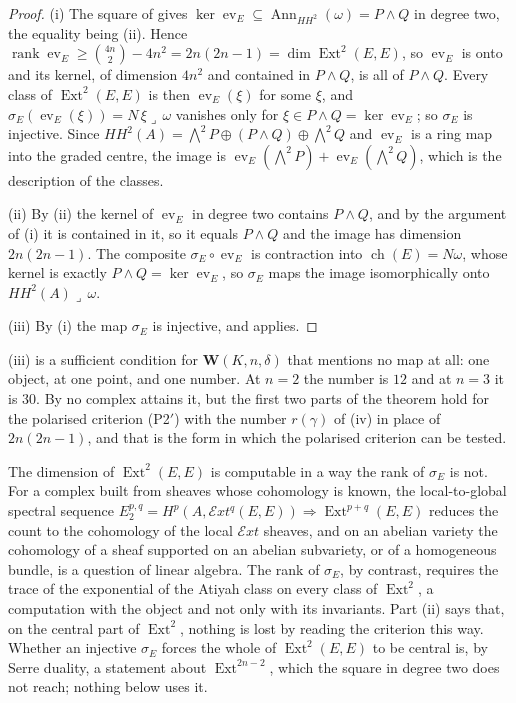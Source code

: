 \documentclass[11pt,reqno]{amsart}
\theoremstyle{plain}
\theoremstyle{definition}
\theoremstyle{remark}
\newcommand{\cE}{\mathcal{E}}
\DeclareMathOperator{\ch}{ch}
\DeclareMathOperator{\Ext}{Ext}
\DeclareMathOperator{\Ann}{Ann}
\begin{document}
\begin{proof}
(i) The square of  gives $\ker\operatorname{ev}_{E}
\subseteq\Ann_{HH^{2}}(\omega)=P\wedge Q$ in degree two, the equality being
(ii). Hence $\operatorname{rank}\operatorname{ev}_{E}
\ge\binom{4n}{2}-4n^{2}=2n(2n-1)=\dim\Ext^{2}(E,E)$, so
$\operatorname{ev}_{E}$ is onto and its kernel, of dimension $4n^{2}$ and
contained in $P\wedge Q$, is all of $P\wedge Q$. Every class of
$\Ext^{2}(E,E)$ is then $\operatorname{ev}_{E}(\xi)$ for some $\xi$, and
$\sigma_{E}(\operatorname{ev}_{E}(\xi))=N\,\xi\lrcorner\,\omega$ vanishes only
for $\xi\in P\wedge Q=\ker\operatorname{ev}_{E}$; so $\sigma_{E}$ is injective.
Since $HH^{2}(A)=\bigwedge^{2}P\oplus(P\wedge Q)\oplus\bigwedge^{2}Q$ and
$\operatorname{ev}_{E}$ is a ring map into the graded centre, the image is
$\operatorname{ev}_{E}(\bigwedge^{2}P)+\operatorname{ev}_{E}(\bigwedge^{2}Q)$,
which is the description of the classes.

(ii) By (ii) the kernel of $\operatorname{ev}_{E}$ in
degree two contains $P\wedge Q$, and by the argument of (i) it is contained in
it, so it equals $P\wedge Q$ and the image has dimension $2n(2n-1)$. The
composite $\sigma_{E}\circ\operatorname{ev}_{E}$ is contraction into
$\ch(E)=N\omega$, whose kernel is exactly $P\wedge Q=\ker\operatorname{ev}_{E}$,
so $\sigma_{E}$ maps the image isomorphically onto
$HH^{2}(A)\lrcorner\,\omega$.

(iii) By (i) the map $\sigma_{E}$ is injective, and 
applies.
\end{proof}

(iii) is a sufficient condition for
$\mathbf{W}(K,n,\delta)$ that mentions no map at all: one object, at one
point, and one number. At $n=2$ the number is $12$ and at $n=3$ it is $30$.
By  no complex attains it, but the first two parts of the
theorem hold for the polarised criterion (P2$'$) with the number $r(\gamma)$
of (iv) in place of $2n(2n-1)$, and that is the form
in which the polarised criterion can be tested.

The dimension of $\Ext^{2}(E,E)$ is computable in a way the rank of
$\sigma_{E}$ is not. For a complex built from sheaves whose cohomology is
known, the local-to-global spectral sequence
$E_{2}^{p,q}=H^{p}(A,\cE xt^{q}(E,E))\Rightarrow\Ext^{p+q}(E,E)$ reduces the
count to the cohomology of the local $\cE xt$ sheaves, and on an abelian
variety the cohomology of a sheaf supported on an abelian subvariety, or of a
homogeneous bundle, is a question of linear algebra. The rank of
$\sigma_{E}$, by contrast, requires the trace of the exponential of the
Atiyah class on every class of $\Ext^{2}$, a computation with the object and
not only with its invariants. Part (ii) says that, on the central part of
$\Ext^{2}$, nothing is lost by reading the criterion this way. Whether an
injective $\sigma_{E}$ forces the whole of $\Ext^{2}(E,E)$ to be central is,
by Serre duality, a statement about $\Ext^{2n-2}$, which the square in degree
two does not reach; nothing below uses it.
\end{document}

